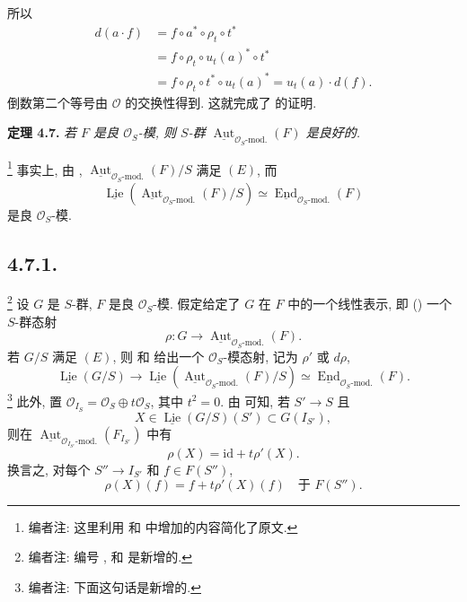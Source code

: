 所以
\[
\begin{aligned}
 d(a\cdot f)
 &=f\circ a^*\circ\rho_t\circ t^*\\
 &=f\circ\rho_t\circ u_t(a)^*\circ t^*\\
 &=f\circ\rho_t\circ t^*\circ u_t(a)^*
  =u_t(a)\cdot d(f).
\end{aligned}
\]
倒数第二个等号由 \(\mathcal O\) 的交换性得到.
这就完成了  的证明.

\medskip
\noindent{}\textbf{定理 4.7.}
\textit{若 \(F\) 是良 \(\mathcal O_S\)-模, 则
\(S\)-群
\(\underline{\operatorname{Aut}}_{\mathcal O_S\text{-mod.}}(F)\)
是良好的.}

\footnote{编者注: 这里利用
 和 
中增加的内容简化了原文.}
事实上, 由 ,
\(\underline{\operatorname{Aut}}_{\mathcal O_S\text{-mod.}}(F)/S\)
满足 \((E)\), 而
\[
 \underline{\operatorname{Lie}}\!
  \left(\underline{\operatorname{Aut}}_{\mathcal O_S\text{-mod.}}(F)/S\right)
 \simeq
 \underline{\operatorname{End}}_{\mathcal O_S\text{-mod.}}(F)
\]
是良 \(\mathcal O_S\)-模.

\subsection*{4.7.1.}
\footnote{编者注: 编号 ,
 和
 是新增的.}
设 \(G\) 是 \(S\)-群, \(F\) 是良
\(\mathcal O_S\)-模. 假定给定了 \(G\) 在 \(F\) 中的一个线性表示,
即 () 一个 \(S\)-群态射
\[
 \rho:G\longrightarrow
 \underline{\operatorname{Aut}}_{\mathcal O_S\text{-mod.}}(F).
\]
若 \(G/S\) 满足 \((E)\), 则
 和 
给出一个 \(\mathcal O_S\)-模态射, 记为 \(\rho'\) 或 \(d\rho\),
\[
 \underline{\operatorname{Lie}}(G/S)
 \longrightarrow
 \underline{\operatorname{Lie}}\!
  \left(\underline{\operatorname{Aut}}_{\mathcal O_S\text{-mod.}}(F)/S\right)
 \simeq
 \underline{\operatorname{End}}_{\mathcal O_S\text{-mod.}}(F).
\]
\footnote{编者注: 下面这句话是新增的.}
此外, 置
\(\mathcal O_{I_S}=\mathcal O_S\oplus t\mathcal O_S\), 其中
\(t^2=0\). 由  可知, 若 \(S'\to S\) 且
\[
 X\in\underline{\operatorname{Lie}}(G/S)(S')\subset G(I_{S'}),
\]
则在
\(\underline{\operatorname{Aut}}_{\mathcal O_{I_{S'}}\text{-mod.}}
(F_{I_{S'}})\) 中有
\begin{equation*}
 \rho(X)=\mathrm{id}+t\rho'(X).
 \tag{*}\label{sga3:ii:subsection:4-7-1:equation:star}
\end{equation*}
换言之, 对每个 \(S''\to I_{S'}\) 和 \(f\in F(S'')\),
\[
 \rho(X)(f)=f+t\rho'(X)(f)
 \quad\text{于 }F(S'').
\]

